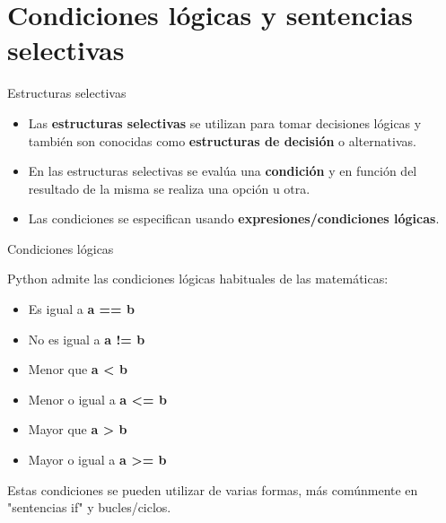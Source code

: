 
\section{Condiciones lógicas y sentencias selectivas}

\begin{frame}[c]{Estructuras selectivas}
  \begin{itemize}
    \item Las \textbf{estructuras selectivas} se utilizan para tomar decisiones
      lógicas y también son conocidas como \textbf{estructuras de decisión} o
      alternativas.
    \pausa
    \item En las estructuras selectivas se evalúa una \textbf{condición} y en
      función del resultado de la misma se realiza una opción u otra.
    \pausa
    \item Las condiciones se especifican usando \textbf{expresiones/condiciones
    lógicas}.
  \end{itemize}
\end{frame}

\begin{frame}[c]{Condiciones lógicas}

  Python admite las condiciones lógicas habituales de las matemáticas:

  \vspace{\baselineskip}
  \begin{itemize}
    \item Es igual a \textbf{a == b}
    \pausa
    \item No es igual a \textbf{a != b}
    \pausa
    \item Menor que \textbf{a < b}
    \pausa
    \item Menor o igual a \textbf{a <= b}
    \pausa
    \item Mayor que \textbf{a > b}
    \pausa
    \item Mayor o igual a \textbf{a >= b}
  \end{itemize}

  \vspace{\baselineskip}
  Estas condiciones se pueden utilizar de varias formas, más
  comúnmente en "sentencias \textcolor{codeKeyword}{if}" y bucles/ciclos.
\end{frame}

